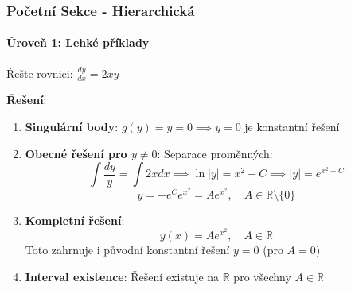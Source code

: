\subsubsection{Početní Sekce - Hierarchická}


\paragraph*{Úroveň 1: Lehké příklady}

\begin{example}
    Řešte rovnici: $\frac{dy}{dx} = 2xy$
    
    \vspace{0.3\baselineskip}
    
    \textbf{Řešení}: 
    \begin{enumerate}
    \item \textbf{Singulární body}: $g(y) = y = 0 \implies y = 0$ je konstantní řešení
    
    \item \textbf{Obecné řešení pro $y \neq 0$}: Separace proměnných:
    \[
    \int \frac{dy}{y} = \int 2x  dx \implies \ln|y| = x^2 + C \implies |y| = e^{x^2 + C}
    \]
    \[
    y = \pm e^C e^{x^2} = Ae^{x^2}, \quad A \in \mathbb{R}\setminus\{0\}
    \]
    
    \item \textbf{Kompletní řešení}: 
    \[
    y(x) = Ae^{x^2}, \quad A \in \mathbb{R}
    \]
    Toto zahrnuje i původní konstantní řešení $y = 0$ (pro $A = 0$)
    
    \item \textbf{Interval existence}: Řešení existuje na $\mathbb{R}$ pro všechny $A \in \mathbb{R}$
    \end{enumerate}
    \end{example}

\vspace{0.6\baselineskip}


